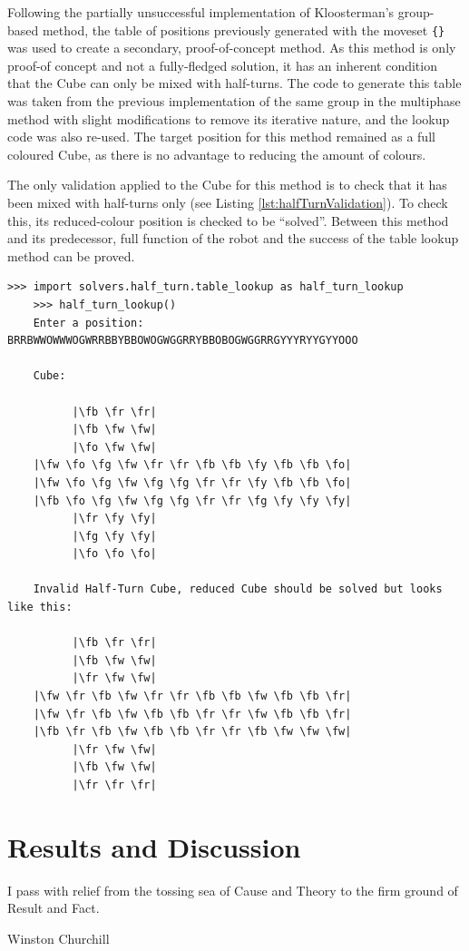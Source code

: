 \documentclass{report}
\newcommand{\moveset}[1]{\uppercase{\texttt{\{\formatmoves{#1}\}}}}
\newcommand{\fw}{\color{gray}W }
\newcommand{\fo}{\color{orange}O }
\newcommand{\fg}{\color{green}G }
\newcommand{\fr}{\color{red}R }
\newcommand{\fb}{\color{blue}B }
\newcommand{\fy}{\color{yellow}Y }
\begin{document}
	Following the partially unsuccessful implementation of Kloosterman's group-based method, the table of positions previously generated with the moveset \moveset{u2d2l2r2f2b2} was used to create a secondary, proof-of-concept method. As this method is only proof-of concept and not a fully-fledged solution, it has an inherent condition that the Cube can only be mixed with half-turns. The code to generate this table was taken from the previous implementation of the same group in the multiphase method with slight modifications to remove its iterative nature, and the lookup code was also re-used. The target position for this method remained as a full coloured Cube, as there is no advantage to reducing the amount of colours.
	
	The only validation applied to the Cube for this method is to check that it has been mixed with half-turns only (see Listing \ref{lst:halfTurnValidation}). To check this, its reduced-colour position is checked to be \enquote{solved}. Between this method and its predecessor, full function of the robot and the success of the table lookup method can be proved.	
	
	\begin{lstlisting}[caption={Half-Turn method validation}, label={lst:halfTurnValidation}]
	>>> import solvers.half_turn.table_lookup as half_turn_lookup
	>>> half_turn_lookup()
	Enter a position: BRRBWWOWWWOGWRRBBYBBOWOGWGGRRYBBOBOGWGGRRGYYYRYYGYYOOO
	
	Cube:
	
	      |\fb \fr \fr|
	      |\fb \fw \fw|
	      |\fo \fw \fw|
	|\fw \fo \fg \fw \fr \fr \fb \fb \fy \fb \fb \fo|
	|\fw \fo \fg \fw \fg \fg \fr \fr \fy \fb \fb \fo|
	|\fb \fo \fg \fw \fg \fg \fr \fr \fg \fy \fy \fy|
	      |\fr \fy \fy|
	      |\fg \fy \fy|
	      |\fo \fo \fo|
	      
	Invalid Half-Turn Cube, reduced Cube should be solved but looks like this:
	
	      |\fb \fr \fr|
	      |\fb \fw \fw|
	      |\fr \fw \fw|
	|\fw \fr \fb \fw \fr \fr \fb \fb \fw \fb \fb \fr|
	|\fw \fr \fb \fw \fb \fb \fr \fr \fw \fb \fb \fr|
	|\fb \fr \fb \fw \fb \fb \fr \fr \fb \fw \fw \fw|
	      |\fr \fw \fw|
	      |\fb \fw \fw|
	      |\fr \fr \fr|\end{lstlisting}
	
    \newpage
    \chapter{Results and Discussion} \label{chp:resultsDiscussion}
   	\epigraph{I pass with relief from the tossing sea of Cause and Theory to the firm ground of Result and Fact.}{Winston Churchill \cite{Churchill1898}}
    
\end{document}
